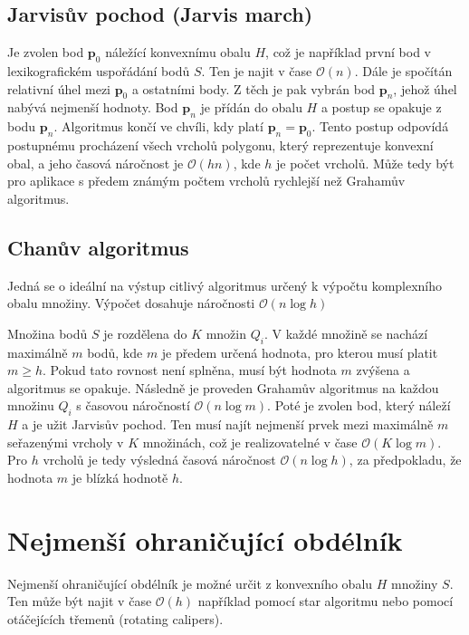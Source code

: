 \documentclass[twoside]{ctuthesis}
\begin{document}
\subsection{Jarvisův pochod (Jarvis march)}
Je zvolen bod $\mathbf{p}_0$ náležící konvexnímu obalu $H$, což je například první bod v lexikografickém uspořádání bodů $S$. Ten je najit v čase $\mathcal{O}(n)$. Dále je spočítán relativní úhel mezi $\mathbf{p}_0$ a ostatními body. Z těch je pak vybrán bod $\mathbf{p}_n$, jehož úhel nabývá nejmenší hodnoty. Bod $\mathbf{p}_n$ je přídán do obalu $H$ a postup se opakuje z bodu $\mathbf{p}_n$. Algoritmus končí ve chvíli, kdy platí $\mathbf{p}_n = \mathbf{p}_0$. Tento postup odpovídá postupnému procházení všech vrcholů polygonu, který reprezentuje konvexní obal, a jeho časová náročnost je $\mathcal{O}(hn)$, kde $h$ je počet vrcholů. Může tedy být pro aplikace s předem známým počtem vrcholů rychlejší než Grahamův algoritmus.

\subsection{Chanův algoritmus}
Jedná se o ideální na výstup citlivý algoritmus určený k výpočtu komplexního obalu množiny. Výpočet dosahuje náročnosti $\mathcal{O}(n\log h)$ 

Množina bodů  $S$ je rozdělena do $K$ množin $Q_i$. V každé množině se nachází maximálně $m$ bodů, kde $m$ je předem určená hodnota, pro kterou musí platit $m \geq h$. Pokud tato rovnost není splněna, musí být hodnota $m$ zvýšena a algoritmus se opakuje. Následně je proveden Grahamův algoritmus na každou množinu $Q_i$ s časovou náročností $\mathcal{O}(n\log m)$. Poté je zvolen bod, který náleží $H$ a je užit Jarvisův pochod. Ten musí najít nejmenší prvek mezi maximálně $m$ seřazenými vrcholy v $K$ množinách, což je realizovatelné v čase $\mathcal{O}(K \log m)$. Pro $h$ vrcholů je tedy výsledná časová náročnost $\mathcal{O}(n \log h)$, za předpokladu, že hodnota $m$ je blízká hodnotě $h$.\cite{chan1996optimal}

\section{Nejmenší ohraničující obdélník}
\label{sec:nejmenší_obdélník}
Nejmenší ohraničující obdélník je možné určit z konvexního obalu $H$ množiny $S$. Ten může být najit v čase $\mathcal{O}(h)$ například pomocí star algoritmu \cite{toussaint1984complexity} nebo pomocí otáčejících třemenů (rotating calipers).
\end{document}
